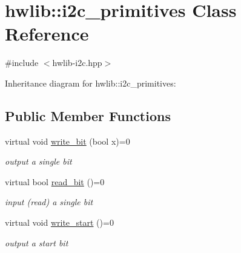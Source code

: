 \hypertarget{classhwlib_1_1i2c__primitives}{}\section{hwlib\+:\+:i2c\+\_\+primitives Class Reference}
\label{classhwlib_1_1i2c__primitives}


{\ttfamily \#include $<$hwlib-\/i2c.\+hpp$>$}



Inheritance diagram for hwlib\+:\+:i2c\+\_\+primitives\+:
\subsection*{Public Member Functions}
\begin{DoxyCompactItemize}
\item 
\mbox{\label{classhwlib_1_1i2c__primitives_a959052f7d29732c4371895b29f4e0b64}} 
virtual void \hyperlink{classhwlib_1_1i2c__primitives_a959052f7d29732c4371895b29f4e0b64}{write\+\_\+bit} (bool x)=0
\begin{DoxyCompactList}\small\item\em output a single bit \end{DoxyCompactList}\item 
\mbox{\label{classhwlib_1_1i2c__primitives_a55a6e105449bcba89fd329a80a065f2c}} 
virtual bool \hyperlink{classhwlib_1_1i2c__primitives_a55a6e105449bcba89fd329a80a065f2c}{read\+\_\+bit} ()=0
\begin{DoxyCompactList}\small\item\em input (read) a single bit \end{DoxyCompactList}\item 
\mbox{\label{classhwlib_1_1i2c__primitives_adc2fc22b39cc81a9871f64325e8e3911}} 
virtual void \hyperlink{classhwlib_1_1i2c__primitives_adc2fc22b39cc81a9871f64325e8e3911}{write\+\_\+start} ()=0
\begin{DoxyCompactList}\small\item\em output a start bit \end{DoxyCompactList}\item 
\mbox{\label{classhwlib_1_1i2c__primitives_a557e3b1319ec01ec0e1f850b24915aa9}} 

\end{DoxyCompactItemize}

